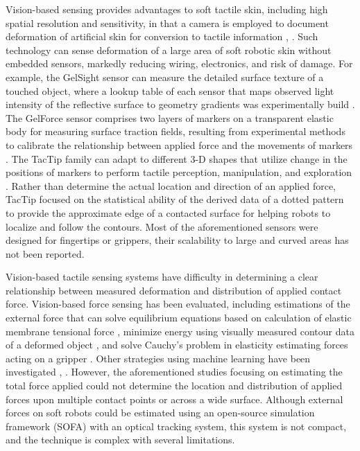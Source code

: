 \documentclass[10pt,letterpaper,journal,final,twoside,twocolumn,nofonttune]{IEEEtran}
\begin{document}
Vision-based sensing provides advantages to soft
tactile skin, including high spatial resolution and sensitivity, in that a camera is employed to document deformation of artificial skin for conversion to tactile information \cite{Shimonomura}, \cite{Alexander}. Such technology can sense deformation of a large area of soft robotic skin without embedded sensors, markedly reducing wiring, electronics, and risk of damage. For example, the GelSight sensor can measure the detailed surface texture of a touched object, where a lookup table of each sensor that maps observed light intensity of the reflective surface to geometry gradients was experimentally build \cite{Yuan}. The GelForce sensor comprises two layers of markers on a transparent elastic body for measuring surface traction fields, resulting from experimental methods to calibrate the relationship between applied force and the movements of markers \cite{Sato}. The TacTip family can adapt to different 3-D shapes that utilize change in the positions of markers to perform tactile perception, manipulation, and exploration \cite{Ward}. Rather than determine the actual location and direction of an applied force, TacTip focused on the statistical ability of the derived data of a dotted pattern to provide the approximate edge of a contacted surface for helping robots to localize and follow the contours. Most of the aforementioned sensors were designed for fingertips or grippers, their scalability to large and curved areas has not been reported.

Vision-based tactile sensing systems have difficulty in determining a clear relationship between measured deformation and distribution of applied contact force. Vision-based force sensing has been evaluated, including estimations  of the 
external force that can solve equilibrium equations based on calculation of elastic membrane tensional force \cite{Ito}, minimize energy using visually measured contour data of a deformed object \cite{Greminger}, and solve Cauchy's problem in elasticity estimating forces acting on a gripper \cite{Reddy}. Other strategies using machine learning have been investigated \cite{Yuan}, \cite{Aviles}. However, the aforementioned studies focusing on estimating the total force applied could not determine the location and distribution of applied forces upon multiple contact points or across a wide surface. Although external forces on soft robots could be estimated using an open-source simulation framework (SOFA) with an optical tracking system\cite{Duriez}, this system is not compact, and the technique is complex with several limitations.
\end{document}
